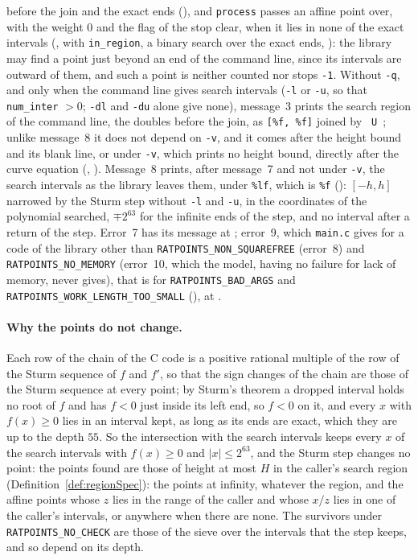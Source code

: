 before the join and the exact ends (), and \verb|process| passes an affine
point over, with the weight $0$ and the flag of the stop clear, when it lies in none of the exact
intervals (, with \verb|in_region|, a binary search over the exact ends,
): the library may find a point just beyond an end of the command line,
since its intervals are outward of them, and such a point is neither counted nor stops \verb|-1|.
Without \verb|-q|, and only when the command line gives search intervals (\verb|-l| or \verb|-u|, so
that \verb|num_inter| $> 0$; \verb|-dl| and \verb|-du| alone give none), message~3 prints the search
region of the command line, the doubles before the join, as \verb|[%f, %f]| joined by \verb| U |;
unlike message~8 it does not depend on \verb|-v|, and it comes after the height bound and its blank
line, or under \verb|-v|, which prints no height bound, directly after the curve equation
(, ). Message~8 prints, after message~7 and not
under \verb|-v|, the search intervals as the library leaves them, under \verb|%lf|, which is
\verb|%f| (): $[-h, h]$ narrowed by the Sturm step without \verb|-l| and
\verb|-u|, in the coordinates of the polynomial searched, $\mp 2^{63}$ for the infinite ends of the
step, and no interval after a return of the step. Error~7 has its message at
; error~9, which \verb|main.c| gives for a code of the library other
than \verb|RATPOINTS_NON_SQUAREFREE| (error~8) and \verb|RATPOINTS_NO_MEMORY| (error~10, which the
model, having no failure for lack of memory, never gives), that is for \verb|RATPOINTS_BAD_ARGS| and
\verb|RATPOINTS_WORK_LENGTH_TOO_SMALL| (), at
.

\paragraph{Why the points do not change.} Each row of the chain of the C code is a positive rational
multiple of the row of the Sturm sequence of $f$ and $f'$, so that the sign changes of the chain are
those of the Sturm sequence at every point; by Sturm's theorem a dropped interval holds no root of
$f$ and has $f < 0$ just inside its left end, so $f < 0$ on it, and every $x$ with $f(x) \ge 0$ lies
in an interval kept, as long as its ends are exact, which they are up to the depth $55$. So the
intersection with the search intervals keeps every $x$ of the search intervals with $f(x) \ge 0$ and
$|x| \le 2^{63}$, and the Sturm step changes no point: the points found are those of height at most
$H$ in the caller's search region (Definition~\ref{def:regionSpec}): the points at infinity,
whatever the region, and the affine points whose $z$ lies in the range of the caller and whose $x/z$
lies in one of the caller's intervals, or anywhere when there are none. The survivors under
\verb|RATPOINTS_NO_CHECK| are those of the sieve over the intervals that the step keeps, and so
depend on its depth.

